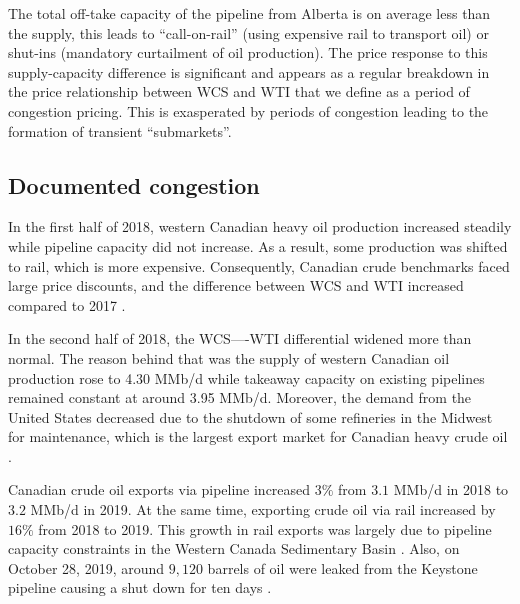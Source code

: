 \documentclass[11pt]{m2pi}
\begin{document}
The total off-take capacity of the pipeline from Alberta is on average less than the supply, this leads to ``call-on-rail'' (using expensive rail to transport oil) or shut-ins (mandatory curtailment of oil production). The price response to this supply-capacity difference is significant and appears as a regular breakdown in the price relationship between WCS and WTI that we define as a period of congestion pricing. This is exasperated by periods of congestion leading to the formation of transient ``submarkets''.


\subsection{Documented congestion}

In the first half of 2018, western Canadian heavy oil production increased steadily while pipeline capacity did not increase. As a result, some production was shifted to rail, which is more expensive. Consequently, Canadian crude benchmarks faced large price discounts, and the difference between WCS and WTI increased compared to 2017 \cite{disruption2018}.

In the second half of 2018, the WCS—-WTI differential widened more than normal. The reason behind that was the supply of western Canadian oil production rose to 4.30 MMb/d while takeaway capacity on existing pipelines remained constant at around 3.95 MMb/d. Moreover, the demand from the United States decreased due to the shutdown of some refineries in the Midwest for maintenance, which is the largest export market for Canadian heavy crude oil \cite{CER2018}.

Canadian crude oil exports via pipeline increased $3\%$ from $3.1$ MMb/d in 2018 to $3.2$ MMb/d in 2019. At the same time, exporting crude oil via rail increased by $16\%$ from 2018 to 2019. This growth in rail exports was largely due to pipeline capacity constraints in the Western Canada Sedimentary Basin \cite{CER2019}. Also, on October 28, 2019, around $9,120$ barrels of oil were leaked from the Keystone pipeline causing a shut down for ten days \cite{CNN2019}.
\end{document}
